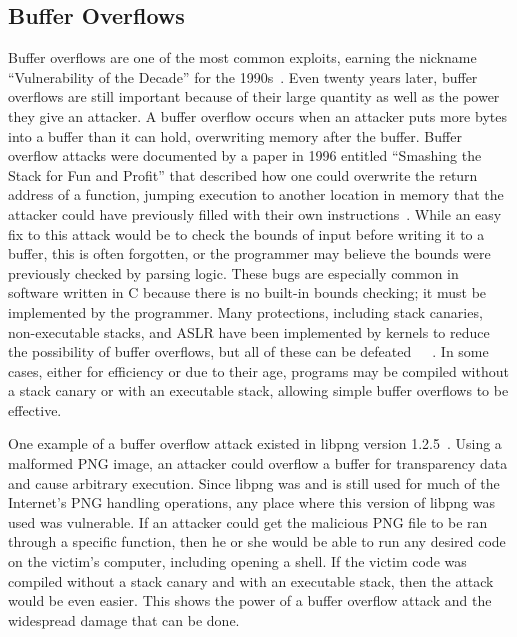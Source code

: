 \subsection{Buffer Overflows}
\label{sec:bufferOverflows}
Buffer overflows are one of the most common exploits, earning the nickname ``Vulnerability of the Decade'' for the 1990s~\cite{cowan2000buffer}.  Even twenty years later, buffer overflows are still important because of their large quantity as well as the power they give an attacker.  A buffer overflow occurs when an attacker puts more bytes into a buffer than it can hold, overwriting memory after the buffer.  Buffer overflow attacks were documented by a paper in 1996 entitled ``Smashing the Stack for Fun and Profit'' that described how one could overwrite the return address of a function, jumping execution to another location in memory that the attacker could have previously filled with their own instructions~\cite{one1996smashing}.  While an easy fix to this attack would be to check the bounds of input before writing it to a buffer, this is often forgotten, or the programmer may believe the bounds were previously checked by parsing logic.  These bugs are especially common in software written in C because there is no built-in bounds checking; it must be implemented by the programmer.  Many protections, including stack canaries, non-executable stacks, and ASLR have been implemented by kernels to reduce the possibility of buffer overflows, but all of these can be defeated~\cite{richarte2002four}~\cite{shacham2007geometry}~\cite{evtyushkin2016jump}.  In some cases, either for efficiency or due to their age, programs may be compiled without a stack canary or with an executable stack, allowing simple buffer overflows to be effective.

One example of a buffer overflow attack existed in libpng version 1.2.5~\cite{CVE-2004-0597}.  Using a malformed PNG image, an attacker could overflow a buffer for transparency data and cause arbitrary execution.  Since libpng was and is still used for much of the Internet's PNG handling operations, any place where this version of libpng was used was vulnerable.  If an attacker could get the malicious PNG file to be ran through a specific function, then he or she would be able to run any desired code on the victim's computer, including opening a shell.  If the victim code was compiled without a stack canary and with an executable stack, then the attack would be even easier.  This shows the power of a buffer overflow attack and the widespread damage that can be done.

